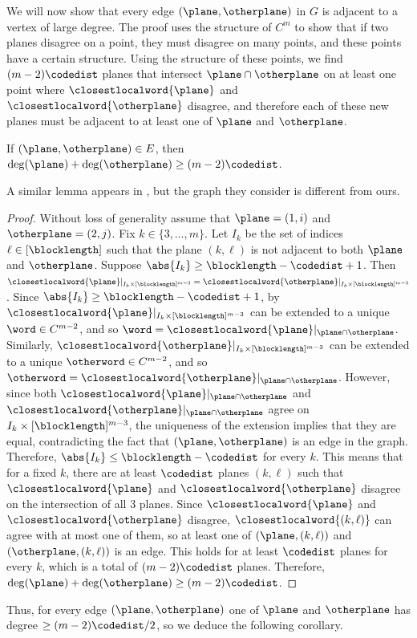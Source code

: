 \documentclass{toc}
\theoremstyle{plain}
\begin{document}
We will now show that every edge $(\plane, \otherplane)$ in $G$ is adjacent to a vertex of large degree. The proof uses the structure of $C^m$ to show that if two planes disagree on a point, they must disagree on many points, and these points have a certain structure. Using the structure of these points, we find $(m-2)\codedist$ planes that intersect $\plane \cap \otherplane$ on at least one point
%
where   %
$\closestlocalword{\plane}$ and $\closestlocalword{\otherplane}$ disagree, and therefore each of these new planes must be adjacent to at least one of $\plane$ and $\otherplane$.
\begin{lemma}\label{lemma:vc}
If $(\plane, \otherplane) \in E$, then $\deg(\plane) + \deg(\otherplane) \geq (m-2) \codedist$.
\end{lemma}
\noindent A similar lemma appears in \cite{Ben-SassonS06}, but the graph they consider is different from ours.
\begin{proof}
Without loss of generality assume that $\plane = (1,i)$ and $\otherplane = (2,j)$. Fix $k \in \{3, \dots, m\}$. Let $I_k$ be the
%
%
set of indices $\ell \in [\blocklength]$ such that                          %
%
the plane $(k,\ell)$ is not adjacent to both $\plane$ and $\otherplane$. Suppose $\abs{I_k} \geq \blocklength - \codedist + 1$. Then $\closestlocalword{\plane} \vert_{I_k \times [\blocklength]^{m-3}} = \closestlocalword{\otherplane} \vert_{I_k \times [\blocklength]^{m-3}}$. Since $\abs{I_k} \geq \blocklength - \codedist + 1$, by  $\closestlocalword{\plane} \vert_{I_k \times [\blocklength]^{m-3}}$ can be extended to a unique $\word \in C^{m-2}$, and so $\word = \closestlocalword{\plane} \vert_{\plane \cap \otherplane}$. Similarly, $\closestlocalword{\otherplane} \vert_{I_k \times [\blocklength]^{m-3}}$ can be extended to a unique $\otherword \in C^{m-2}$, and so $\otherword = \closestlocalword{\otherplane} \vert_{\plane \cap \otherplane}$. However, since both $ \closestlocalword{\plane} \vert_{\plane \cap \otherplane}$ and $ \closestlocalword{\otherplane} \vert_{\plane \cap \otherplane}$ agree on $I_k \times [\blocklength]^{m-3}$, the uniqueness of the extension implies that they are equal, contradicting the fact that $(\plane, \otherplane)$ is an edge in the graph. Therefore, $\abs{I_k} \leq \blocklength - \codedist$ for every $k$. This means that for a fixed $k$, there are at least $\codedist$ planes $(k,\ell)$ such that $\closestlocalword{\plane}$ and $\closestlocalword{\otherplane}$ disagree on the intersection of all $3$ planes. Since $\closestlocalword{\plane}$ and $\closestlocalword{\otherplane}$ disagree, $\closestlocalword{(k,\ell)}$ can agree with at most one of them, so at least one of $(\plane, (k,\ell))$ and $(\otherplane, (k,\ell))$ is an edge. This holds for at least $\codedist$ planes for every $k$, which is a total of $(m-2)\codedist$ planes. Therefore, $\deg(\plane) + \deg(\otherplane) \geq (m-2)\codedist$.    %
\end{proof}
%
Thus, for every edge $(\plane, \otherplane)$ one of $\plane$ and $\otherplane$ has degree $\geq (m-2)\codedist/2$, so we deduce the following corollary.
\end{document}
